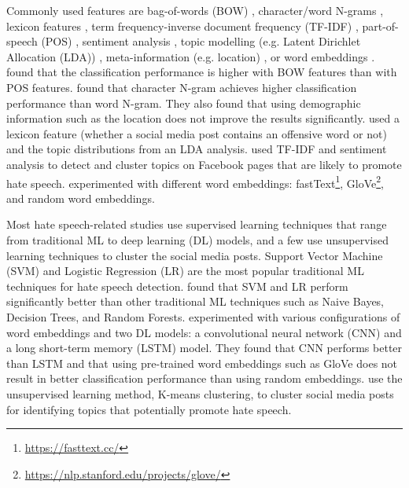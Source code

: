 %
Commonly used features are bag-of-words (BOW) \citep{greevy2004classifying}, character/word N-grams \citep{waseem2016hateful}, lexicon features \citep{xiang2012detecting},  term frequency-inverse document frequency (TF-IDF) \citep{badjatiya2017deep, davidson2017automated, rodriguez2019automatic}, part-of-speech (POS) \citep{greevy2004classifying}, sentiment analysis \citep{rodriguez2019automatic}, topic modelling (e.g. Latent Dirichlet Allocation (LDA)) \citep{xiang2012detecting}, meta-information (e.g. location) \citep{waseem2016hateful}, or word embeddings \citep{badjatiya2017deep, agrawal2018deep}.
%
\citet{greevy2004classifying} found that the classification performance is higher with BOW features than with POS features.
%
\citet{waseem2016hateful} found that character N-gram achieves higher classification performance than word N-gram.
%
They also found that using demographic information such as the location does not improve the results significantly.
%
\citet{xiang2012detecting} used a lexicon feature (whether a social media post contains an offensive word or not) and the topic distributions from an LDA analysis.
%
\citet{rodriguez2019automatic} used TF-IDF and sentiment analysis to detect and cluster topics on Facebook pages that are likely to promote hate speech.
%
\citet{badjatiya2017deep} experimented with different word embeddings: fastText\footnote{\url{https://fasttext.cc/}}, GloVe\footnote{\url{https://nlp.stanford.edu/projects/glove/}}, and random word embeddings.
%

Most hate speech-related studies use supervised learning techniques that range from traditional ML to deep learning (DL) models, and a few use unsupervised learning techniques to cluster the social media posts.
%
Support Vector Machine (SVM) \citep{greevy2004classifying, xiang2012detecting,davidson2017automated} and Logistic Regression (LR) \citep{waseem2016hateful, davidson2017automated} are the most popular traditional ML techniques for hate speech detection.
%
\citet{davidson2017automated} found that SVM and LR perform significantly better than other traditional ML techniques such as Naive Bayes, Decision Trees, and Random Forests.
%
\citet{badjatiya2017deep} experimented with various configurations of word embeddings and two DL models: a convolutional neural network (CNN) and a long short-term memory (LSTM) model.
%
They found that CNN performs better than LSTM and that using pre-trained word embeddings such as GloVe does not result in better classification performance than using random embeddings.
%
\citet{rodriguez2019automatic} use the unsupervised learning method, K-means clustering, to cluster social media posts for identifying topics that potentially promote hate speech.
%


